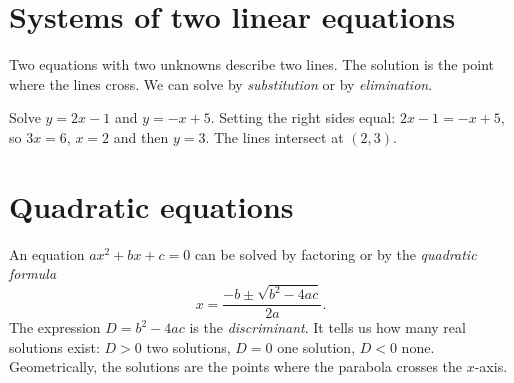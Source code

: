\section*{Systems of two linear equations}
Two equations with two unknowns describe two lines. The solution is the point where the lines cross. We can solve by \emph{substitution} or by \emph{elimination}.

\begin{example}
Solve $y=2x-1$ and $y=-x+5$. Setting the right sides equal: $2x-1=-x+5$, so $3x=6$, $x=2$ and then $y=3$. The lines intersect at $(2,3)$.
\end{example}

\begin{center}

\label{fig:b1_7}
\end{center}

\section*{Quadratic equations}
An equation $ax^2+bx+c=0$ can be solved by factoring or by the \emph{quadratic formula}
\[
x=\frac{-b\pm\sqrt{b^2-4ac}}{2a}.
\]
The expression $D=b^2-4ac$ is the \emph{discriminant}. It tells us how many real solutions exist: $D>0$ two solutions, $D=0$ one solution, $D<0$ none. Geometrically, the solutions are the points where the parabola crosses the $x$-axis.


